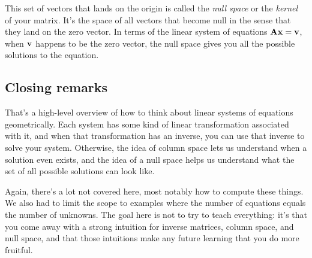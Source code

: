 This set of vectors that lands on the origin is called the \textit{null space}
or the \textit{kernel} of your matrix. It's the space of all vectors that become
null in the sense that they land on the zero vector. In terms of the linear
system of equations $\mathbf{A}\mathbf{x} = \mathbf{v}$, when $\mathbf{v}$ happens to be the
zero vector, the null space gives you all the possible solutions to the
equation.

\subsection{Closing remarks}

That's a high-level overview of how to think about linear systems of equations
geometrically. Each system has some kind of linear transformation associated
with it, and when that transformation has an inverse, you can use that inverse
to solve your system. Otherwise, the idea of column space lets us understand
when a solution even exists, and the idea of a null space helps us understand
what the set of all possible solutions can look like.

Again, there's a lot not covered here, most notably how to compute these things.
We also had to limit the scope to examples where the number of equations equals
the number of unknowns. The goal here is not to try to teach everything: it's
that you come away with a strong intuition for inverse matrices, column space,
and null space, and that those intuitions make any future learning that you do
more fruitful.
